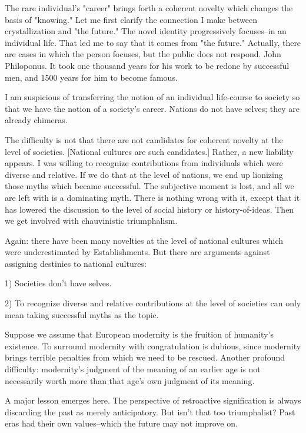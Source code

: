 \begin{enumerate}[label=\alph*.]
The rare individual’s "career" brings forth a coherent novelty which changes the basis of "knowing." Let me first clarify the connection I make between crystallization and "the future." The novel identity progressively focuses–in an individual life. That led me to say that it comes from "the future." Actually, there are cases in which the person focuses, but the public does not respond. John Philoponus. It took one thousand years for his work to be redone by successful men, and 1500 years for him to become famous.

I am suspicious of transferring the notion of an individual life-course to society so that we have the notion of a society’s career. Nations do not have selves; they are already chimeras.

The difficulty is not that there are not candidates for coherent novelty at the level of societies. [National cultures are such candidates.] Rather, a new liability appears. I was willing to recognize contributions from individuals which were diverse and relative. If we do that at the level of nations, we end up lionizing those myths which became successful. The subjective moment is lost, and all we are left with is a dominating myth. There is nothing wrong with it, except that it has lowered the discussion to the level of social history or history-of-ideas. Then we get involved with chauvinistic triumphalism.

Again: there have been many novelties at the level of national cultures which were underestimated by Establishments. But there are arguments against assigning destinies to national cultures:

1) Societies don’t have selves.

2) To recognize diverse and relative contributions at the level of societies can only mean taking successful myths as the topic.

Suppose we assume that European modernity is the fruition of humanity’s existence. To surround modernity with congratulation is dubious, since modernity brings terrible penalties from which we need to be rescued. Another profound difficulty: modernity’s judgment of the meaning of an earlier age is not necessarily worth more than that age’s own judgment of its meaning.

A major lesson emerges here. The perspective of retroactive signification is always discarding the past as merely anticipatory. But isn’t that too triumphalist? Past eras had their own values–which the future may not improve on.


\end{enumerate}
